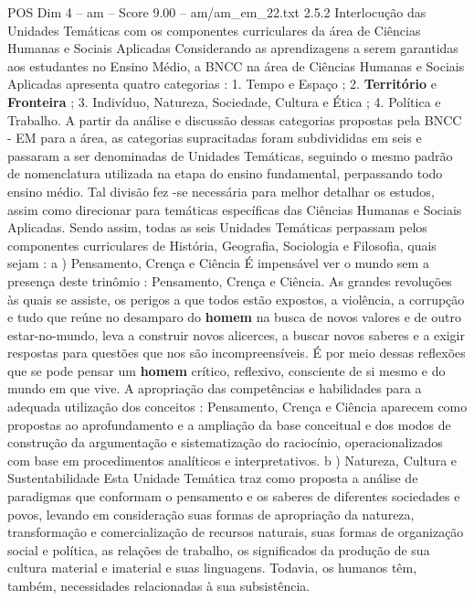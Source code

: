 \begin{textsample}{POS Dim 4 – am – Score 9.00 – am/am\_em\_22.txt}  \label{ex:f4_pos_108}
2.5.2 Interlocução das Unidades Temáticas com os componentes curriculares da área de Ciências Humanas e Sociais Aplicadas Considerando as aprendizagens a serem garantidas aos estudantes no Ensino Médio, a BNCC na área de Ciências Humanas e Sociais Aplicadas apresenta quatro categorias : 1.
Tempo e Espaço ; 2. \textbf{Território} e \textbf{Fronteira} ; 3.
Indivíduo, Natureza, Sociedade, Cultura e Ética ; 4.
Política e Trabalho.
A partir da análise e discussão dessas categorias propostas pela BNCC - EM para a área, as categorias supracitadas foram subdivididas em seis e passaram a ser denominadas de Unidades Temáticas, seguindo o mesmo padrão de nomenclatura utilizada na etapa do ensino fundamental, perpassando todo ensino médio.
Tal divisão fez -se necessária para melhor detalhar os estudos, assim como direcionar para temáticas específicas das Ciências Humanas e Sociais Aplicadas.
Sendo assim, todas as seis Unidades Temáticas perpassam pelos componentes curriculares de História, Geografia, Sociologia e Filosofia, quais sejam : a ) Pensamento, Crença e Ciência É impensável ver o mundo sem a presença deste trinômio : Pensamento, Crença e Ciência.
As grandes revoluções às quais se assiste, os perigos a que todos estão expostos, a violência, a corrupção e tudo que reúne no desamparo do \textbf{homem} na busca de novos valores e de outro estar-no-mundo, leva a construir novos alicerces, a buscar novos saberes e a exigir respostas para questões que nos são incompreensíveis.
É por meio dessas reflexões que se pode pensar um \textbf{homem} crítico, reflexivo, consciente de si mesmo e do mundo em que vive.
A apropriação das competências e habilidades para a adequada utilização dos conceitos : Pensamento, Crença e Ciência aparecem como propostas ao aprofundamento e a ampliação da base conceitual e dos modos de construção da argumentação e sistematização do raciocínio, operacionalizados com base em procedimentos analíticos e interpretativos. b ) Natureza, Cultura e Sustentabilidade Esta Unidade Temática traz como proposta a análise de paradigmas que conformam o pensamento e os saberes de diferentes sociedades e povos, levando em consideração suas formas de apropriação da natureza, transformação e comercialização de recursos naturais, suas formas de organização social e política, as relações de trabalho, os significados da produção de sua cultura material e imaterial e suas linguagens.
Todavia, os humanos têm, também, necessidades relacionadas à sua subsistência.

\end{textsample}
